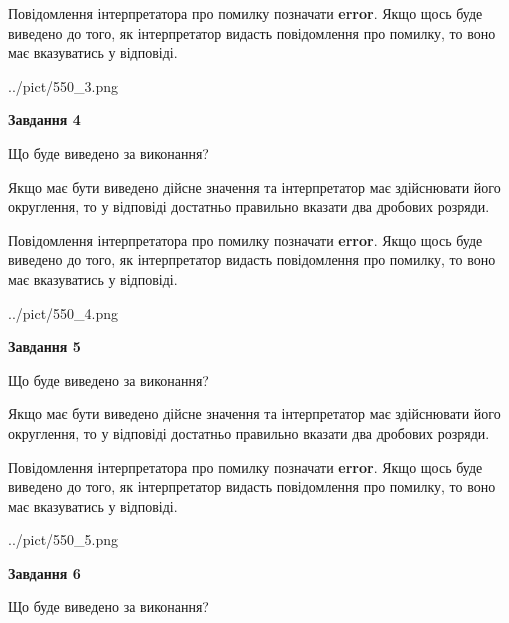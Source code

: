 \documentclass[12pt, ukrainian]{article}
\begin{document}
{\begin {Large}
Повідомлення інтерпретатора про помилку позначати \textbf{error}.
Якщо щось буде виведено до того, як інтерпретатор видасть повідомлення про помилку, 
то воно має вказуватись у відповіді. \par

\begin{center}
	{../pict/550_3.png}
\end{center}
\newpage

{\begin {center}\textbf{Завдання 4}\end {center}}\par
Що буде виведено за виконання? \par

Якщо має бути виведено дійсне значення та інтерпретатор має здійснювати його округлення, 
то у відповіді достатньо правильно вказати два дробових розряди.

Повідомлення інтерпретатора про помилку позначати \textbf{error}.
Якщо щось буде виведено до того, як інтерпретатор видасть повідомлення про помилку, 
то воно має вказуватись у відповіді. \par

\begin{center}
	{../pict/550_4.png}
\end{center}
\newpage

{\begin {center}\textbf{Завдання 5}\end {center}}\par
Що буде виведено за виконання? \par

Якщо має бути виведено дійсне значення та інтерпретатор має здійснювати його округлення, 
то у відповіді достатньо правильно вказати два дробових розряди.

Повідомлення інтерпретатора про помилку позначати \textbf{error}.
Якщо щось буде виведено до того, як інтерпретатор видасть повідомлення про помилку, 
то воно має вказуватись у відповіді. \par

\begin{center}
	{../pict/550_5.png}
\end{center}
\newpage

{\begin {center}\textbf{Завдання 6}\end {center}}\par
Що буде виведено за виконання? \par


\end{Large}}
\end{document}
